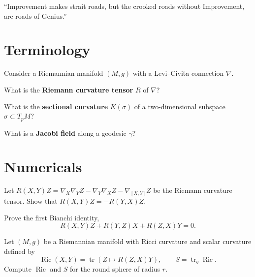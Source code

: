 \documentclass{homework}
\author{Jim Fowler}
\begin{document}
\maketitle

\begin{inspiration}
  ``Improvement makes strait roads, but the crooked roads without Improvement, are roads of Genius.''
\end{inspiration}

\section{Terminology}

\begin{problem}
  Consider a Riemannian manifold $(M,g)$ with a Levi--Civita connection $\nabla$.

  What is the \textbf{Riemann curvature tensor} $R$ of $\nabla$?
\end{problem}

\begin{problem}
  What is the \textbf{sectional curvature} $K(\sigma)$ of a two-dimensional subspace $\sigma \subset T_pM$?
\end{problem}

\begin{problem}
  What is a \textbf{Jacobi field} along a geodesic $\gamma$?
\end{problem}

\section{Numericals}

\begin{problem}\label{curvature-symmetries}
  Let $R(X,Y)Z = \nabla_X\nabla_YZ - \nabla_Y\nabla_XZ - \nabla_{[X,Y]}Z$ be the Riemann curvature tensor. Show that
  $R(X,Y)Z = -R(Y,X)Z$.
\end{problem}

\begin{problem}
  Prove the first Bianchi identity,
  \[
    R(X,Y)Z + R(Y,Z)X + R(Z,X)Y = 0.
  \]
\end{problem}

\begin{problem}
  Let $(M,g)$ be a Riemannian manifold with Ricci curvature and scalar curvature defined by
  \[
    \operatorname{Ric}(X,Y) = \operatorname{tr}(Z \mapsto R(Z,X)Y),
    \qquad
    S = \operatorname{tr}_g \operatorname{Ric}.
  \]
  Compute $\operatorname{Ric}$ and $S$ for the round sphere of radius $r$.
\end{problem}
\end{document}
